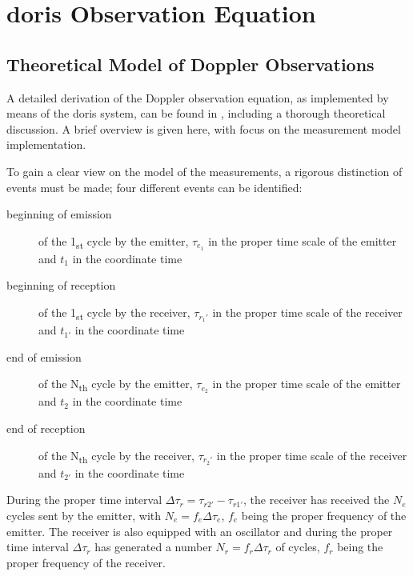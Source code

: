 \section{\gls{doris} Observation Equation}\label{sec:doris-observation-equation}

\subsection{Theoretical Model of Doppler Observations}\label{ssec:doris-obs-theory}
A detailed derivation of the Doppler observation equation, as implemented by means of the 
\gls{doris} system, can be found in \cite{Lemoine2016}, including a thorough theoretical 
discussion. A brief overview is given here, with focus on the measurement model 
implementation.

To gain a clear view on the model of the measurements, a rigorous distinction of 
events must be made; four different events can be identified:
\begin{description}
    \item[beginning of emission] of the 1\textsubscript{st} cycle by the emitter, 
    \(\tau_{e_1}\) in the proper time scale of the emitter and \(t_1\) in the coordinate 
    time
    
    \item[beginning of reception] of the 1\textsubscript{st} cycle by the receiver, 
    \(\tau_{r_1'}\) in the proper time scale of the receiver and 
    \(t_{1'}\) in the coordinate time

    \item[end of emission] of the N\textsubscript{th} cycle by the emitter, 
    \(\tau_{e_2}\) in the proper time scale of the emitter and \(t_2\) in the coordinate 
    time
    
    \item[end of reception] of the N\textsubscript{th} cycle by the receiver, 
    \(\tau_{r_2'}\) in the proper time scale of the receiver and 
    \(t_{2'}\) in the coordinate time
\end{description}

During the proper time interval $\Delta\tau_{r} = \tau_{r2'} - \tau_{r1'}$, 
the receiver has received the $N_e$ cycles sent by the emitter, with $N_e = f_e \Delta\tau_e$, 
$f_e$ being the proper frequency of the emitter. The receiver is also equipped with
an oscillator and during the proper time interval $\Delta\tau_{r}$ has generated 
a number $N_r = f_r \Delta\tau_r$ of cycles, $f_r$ being the proper frequency of the 
receiver.

